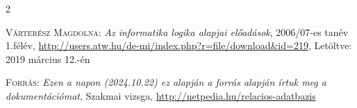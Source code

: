\documentclass[colorlinks]{thesis-kando}
\theoremstyle{definition}
\theoremstyle{remark}
\begin{document}
\begin{thebibliography}{2}
 \textsc{Várterész Magdolna}: \emph{Az informatika logika alapjai előadások}, 2006/07-es tanév 1.félév, \url{http://users.atw.hu/de-mi/index.php?r=file/download\&id=219},  Letöltve: 2019 március 12.-én 

 \textsc{Forrás}: 
\emph{Ezen a napon (2024.10.22) ez alapján a forrás alapján írtuk meg a dokumentációmat}, Szakmai vizsga, \url{http://netpedia.hu/relacios-adatbazis}
\end{thebibliography}


\end{document}
